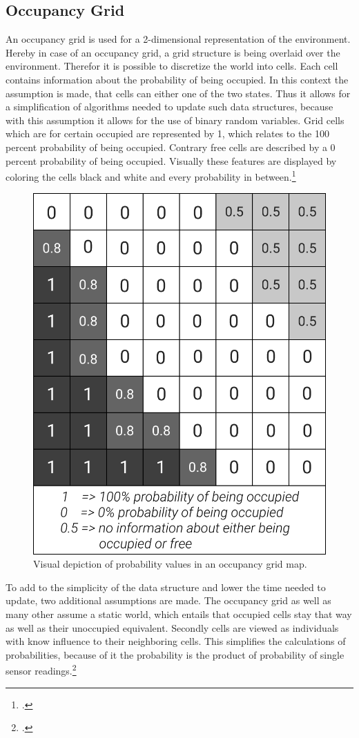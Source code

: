 \subsection{Occupancy Grid}
An occupancy grid is used for a 2-dimensional representation of the environment. Hereby in case of an occupancy grid, a grid structure is being overlaid over the environment. Therefor it is possible to discretize the world into cells. Each cell contains information about the probability of being occupied. In this context the assumption is made, that cells can either one of the two states. Thus it allows for a simplification of algorithms needed to update such data structures, because with this assumption it allows for the use of binary random variables. Grid cells which are for certain occupied are represented by 1, which relates to the 100 percent probability of being occupied. Contrary free cells are described by a 0 percent probability of being occupied. Visually these features are displayed by coloring the cells black and white and every probability in between.\footcite{OccupancyGridMaps2020}

\begin{figure}[h]
	\centering
	\includegraphics[width=0.5\linewidth]{img/OccupancyGridCells}
	\caption{Visual depiction of probability values in an occupancy grid map.}
	\label{fig:abstract_environments_occupancyCells}
\end{figure}

To add to the simplicity of the data structure and lower the time needed to update, two additional assumptions are made. The occupancy grid as well as many other assume a static world, which entails that occupied cells stay that way as well as their unoccupied equivalent. Secondly cells are viewed as individuals with know influence to their neighboring cells. This simplifies the calculations of probabilities, because of it the probability is the product of probability of single sensor readings.\footcite{uni-freiburgOccupancyGridMaps2020}

